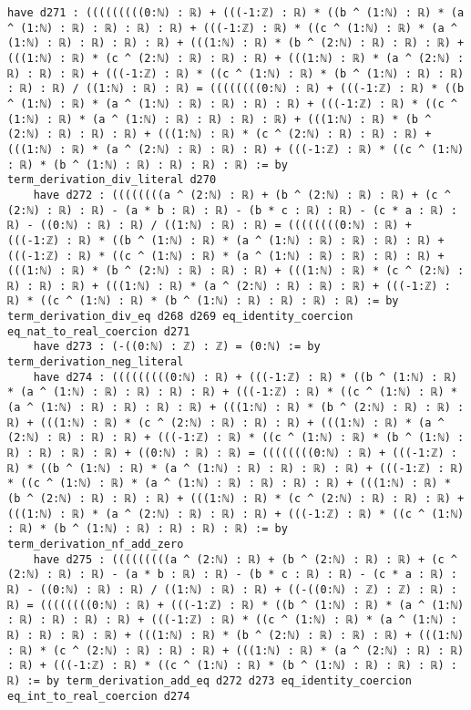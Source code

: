 \documentclass{article}
\begin{document}
\begin{tcolorbox}[colback=white!10, width=\linewidth]
\begin{lstlisting}[language=Lean4]
    have d271 : (((((((((0:ℕ) : ℝ) + (((-1:ℤ) : ℝ) * ((b ^ (1:ℕ) : ℝ) * (a ^ (1:ℕ) : ℝ) : ℝ) : ℝ) : ℝ) + (((-1:ℤ) : ℝ) * ((c ^ (1:ℕ) : ℝ) * (a ^ (1:ℕ) : ℝ) : ℝ) : ℝ) : ℝ) + (((1:ℕ) : ℝ) * (b ^ (2:ℕ) : ℝ) : ℝ) : ℝ) + (((1:ℕ) : ℝ) * (c ^ (2:ℕ) : ℝ) : ℝ) : ℝ) + (((1:ℕ) : ℝ) * (a ^ (2:ℕ) : ℝ) : ℝ) : ℝ) + (((-1:ℤ) : ℝ) * ((c ^ (1:ℕ) : ℝ) * (b ^ (1:ℕ) : ℝ) : ℝ) : ℝ) : ℝ) / ((1:ℕ) : ℝ) : ℝ) = ((((((((0:ℕ) : ℝ) + (((-1:ℤ) : ℝ) * ((b ^ (1:ℕ) : ℝ) * (a ^ (1:ℕ) : ℝ) : ℝ) : ℝ) : ℝ) + (((-1:ℤ) : ℝ) * ((c ^ (1:ℕ) : ℝ) * (a ^ (1:ℕ) : ℝ) : ℝ) : ℝ) : ℝ) + (((1:ℕ) : ℝ) * (b ^ (2:ℕ) : ℝ) : ℝ) : ℝ) + (((1:ℕ) : ℝ) * (c ^ (2:ℕ) : ℝ) : ℝ) : ℝ) + (((1:ℕ) : ℝ) * (a ^ (2:ℕ) : ℝ) : ℝ) : ℝ) + (((-1:ℤ) : ℝ) * ((c ^ (1:ℕ) : ℝ) * (b ^ (1:ℕ) : ℝ) : ℝ) : ℝ) : ℝ) := by term_derivation_div_literal d270
    have d272 : ((((((((a ^ (2:ℕ) : ℝ) + (b ^ (2:ℕ) : ℝ) : ℝ) + (c ^ (2:ℕ) : ℝ) : ℝ) - (a * b : ℝ) : ℝ) - (b * c : ℝ) : ℝ) - (c * a : ℝ) : ℝ) - ((0:ℕ) : ℝ) : ℝ) / ((1:ℕ) : ℝ) : ℝ) = ((((((((0:ℕ) : ℝ) + (((-1:ℤ) : ℝ) * ((b ^ (1:ℕ) : ℝ) * (a ^ (1:ℕ) : ℝ) : ℝ) : ℝ) : ℝ) + (((-1:ℤ) : ℝ) * ((c ^ (1:ℕ) : ℝ) * (a ^ (1:ℕ) : ℝ) : ℝ) : ℝ) : ℝ) + (((1:ℕ) : ℝ) * (b ^ (2:ℕ) : ℝ) : ℝ) : ℝ) + (((1:ℕ) : ℝ) * (c ^ (2:ℕ) : ℝ) : ℝ) : ℝ) + (((1:ℕ) : ℝ) * (a ^ (2:ℕ) : ℝ) : ℝ) : ℝ) + (((-1:ℤ) : ℝ) * ((c ^ (1:ℕ) : ℝ) * (b ^ (1:ℕ) : ℝ) : ℝ) : ℝ) : ℝ) := by term_derivation_div_eq d268 d269 eq_identity_coercion eq_nat_to_real_coercion d271
    have d273 : (-((0:ℕ) : ℤ) : ℤ) = (0:ℕ) := by term_derivation_neg_literal
    have d274 : (((((((((0:ℕ) : ℝ) + (((-1:ℤ) : ℝ) * ((b ^ (1:ℕ) : ℝ) * (a ^ (1:ℕ) : ℝ) : ℝ) : ℝ) : ℝ) + (((-1:ℤ) : ℝ) * ((c ^ (1:ℕ) : ℝ) * (a ^ (1:ℕ) : ℝ) : ℝ) : ℝ) : ℝ) + (((1:ℕ) : ℝ) * (b ^ (2:ℕ) : ℝ) : ℝ) : ℝ) + (((1:ℕ) : ℝ) * (c ^ (2:ℕ) : ℝ) : ℝ) : ℝ) + (((1:ℕ) : ℝ) * (a ^ (2:ℕ) : ℝ) : ℝ) : ℝ) + (((-1:ℤ) : ℝ) * ((c ^ (1:ℕ) : ℝ) * (b ^ (1:ℕ) : ℝ) : ℝ) : ℝ) : ℝ) + ((0:ℕ) : ℝ) : ℝ) = ((((((((0:ℕ) : ℝ) + (((-1:ℤ) : ℝ) * ((b ^ (1:ℕ) : ℝ) * (a ^ (1:ℕ) : ℝ) : ℝ) : ℝ) : ℝ) + (((-1:ℤ) : ℝ) * ((c ^ (1:ℕ) : ℝ) * (a ^ (1:ℕ) : ℝ) : ℝ) : ℝ) : ℝ) + (((1:ℕ) : ℝ) * (b ^ (2:ℕ) : ℝ) : ℝ) : ℝ) + (((1:ℕ) : ℝ) * (c ^ (2:ℕ) : ℝ) : ℝ) : ℝ) + (((1:ℕ) : ℝ) * (a ^ (2:ℕ) : ℝ) : ℝ) : ℝ) + (((-1:ℤ) : ℝ) * ((c ^ (1:ℕ) : ℝ) * (b ^ (1:ℕ) : ℝ) : ℝ) : ℝ) : ℝ) := by term_derivation_nf_add_zero
    have d275 : (((((((((a ^ (2:ℕ) : ℝ) + (b ^ (2:ℕ) : ℝ) : ℝ) + (c ^ (2:ℕ) : ℝ) : ℝ) - (a * b : ℝ) : ℝ) - (b * c : ℝ) : ℝ) - (c * a : ℝ) : ℝ) - ((0:ℕ) : ℝ) : ℝ) / ((1:ℕ) : ℝ) : ℝ) + ((-((0:ℕ) : ℤ) : ℤ) : ℝ) : ℝ) = ((((((((0:ℕ) : ℝ) + (((-1:ℤ) : ℝ) * ((b ^ (1:ℕ) : ℝ) * (a ^ (1:ℕ) : ℝ) : ℝ) : ℝ) : ℝ) + (((-1:ℤ) : ℝ) * ((c ^ (1:ℕ) : ℝ) * (a ^ (1:ℕ) : ℝ) : ℝ) : ℝ) : ℝ) + (((1:ℕ) : ℝ) * (b ^ (2:ℕ) : ℝ) : ℝ) : ℝ) + (((1:ℕ) : ℝ) * (c ^ (2:ℕ) : ℝ) : ℝ) : ℝ) + (((1:ℕ) : ℝ) * (a ^ (2:ℕ) : ℝ) : ℝ) : ℝ) + (((-1:ℤ) : ℝ) * ((c ^ (1:ℕ) : ℝ) * (b ^ (1:ℕ) : ℝ) : ℝ) : ℝ) : ℝ) := by term_derivation_add_eq d272 d273 eq_identity_coercion eq_int_to_real_coercion d274

\end{lstlisting}
\end{tcolorbox}
\end{document}
